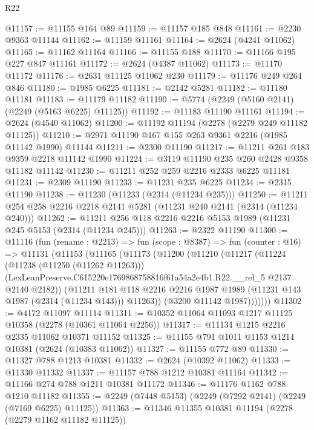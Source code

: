 \begin{lexlean}{R22}
\begin{coremodule}
@11157 := @11155 @164 @89
@11159 := @11157 @185 @848
@11161 := @2230 @9363 @11144
@11162 := @11159 @11161
@11164 := @2624 (@4241 @11062)
@11165 := @11162 @11164
@11166 := @11155 @188
@11170 := @11166 @195 @227 @847 @11161
@11172 := @2624 (@4387 @11062)
@11173 := @11170 @11172
@11176 := @2631 @11125 @11062 @230
@11179 := @11176 @249 @264 @846
@11180 := @1985 @6225
@11181 := @2142 @5281
@11182 := @11180 @11181
@11183 := @11179 @11182
@11190 := @5774 (@2249 (@5160 @2141) (@2249 (@5163 @6225) @11125))
@11192 := @11183 @11190 @11161
@11194 := @2624 (@4540 @11062)
@11200 := @11192 @11194 (@2278 (@2279 @249 @11182 @11125))
@11210 := @2971 @11190 @167 @155 @263 @9361 @2216 (@1985 @11142 @1990) @11144
@11211 := @2300 @11190
@11217 := @11211 @261 @183 @9359 @2218 @11142 @1990
@11224 := @3119 @11190 @235 @260 @2428 @9358 @11182 @11142
@11230 := @11211 @252 @259 @2216 @2333 @6225 @11181
@11231 := @2309 @11190
@11233 := @11231 @235 @6225
@11234 := @2315 @11190
@11238 := @11230 (@11233 (@2314 (@11234 @235)))
@11250 := @11211 @254 @258 @2216 @2218 @2141 @5281 (@11231 @240 @2141 (@2314 (@11234 @240)))
@11262 := @11211 @256 @118 @2216 @2216 @5153 @1989 (@11231 @245 @5153 (@2314 (@11234 @245)))
@11263 := @2322 @11190
@11300 := @11116
    (fun (rename : @2213) =>
    fun (scope : @8387) =>
    fun (counter : @16) =>
    @11131
      (@11153
        (@11165
          (@11173
            (@11200
              (@11210
                (@11217
                  (@11224
                    (@11238 (@11250 (@11262 @11263)))
                    (LexLeanPreserve.C615220e1769868758816f61a54a2e4b1.R22.__rel_5
                      @2137
                      @2140
                      @2182))
                  (@11211
                    @181
                    @118
                    @2216
                    @2216
                    @1987
                    @1989
                    (@11231 @143 @1987 (@2314 (@11234 @143)))
                    @11263))
                (@3200 @11142 @1987)))))))
@11302 := @4172 @11097 @11114
@11311 := @10352 @11064 @11093 @1217 @11125 @10358 (@2278 (@10361 @11064 @2256))
@11317 := @11134 @1215 @2216 @2335 @11062 @10371 @11152
@11325 := @11155 @791 @1011 @1153 @1214 @10381 (@2624 (@10383 @11062))
@11327 := @11155 @772 @89
@11330 := @11327 @788 @1213 @10381
@11332 := @2624 (@10392 @11062)
@11333 := @11330 @11332
@11337 := @11157 @788 @1212 @10381 @11164
@11342 := @11166 @274 @788 @1211 @10381 @11172
@11346 := @11176 @1162 @788 @1210 @11182
@11355 := @2249 (@7448 @5153) (@2249 (@7292 @2141) (@2249 (@7169 @6225) @11125))
@11363 := @11346 @11355 @10381 @11194 (@2278 (@2279 @1162 @11182 @11125))

\end{coremodule}
\end{lexlean}
